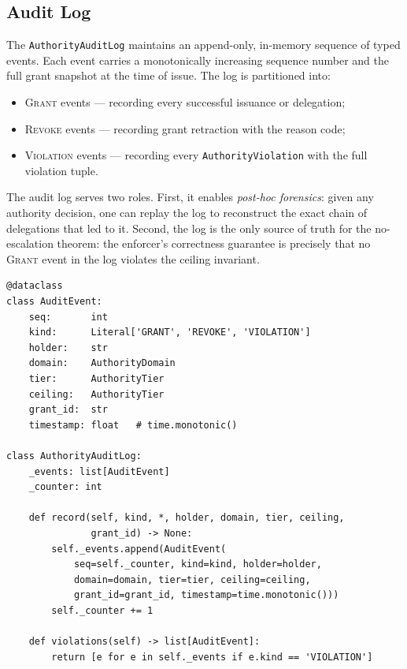\documentclass[11pt]{article}
\begin{document}
\subsection{Audit Log}

The \texttt{AuthorityAuditLog} maintains an append-only, in-memory
sequence of typed events.  Each event carries a monotonically
increasing sequence number and the full grant snapshot at the time of
issue.  The log is partitioned into:
\begin{itemize}[leftmargin=1.5em,itemsep=2pt]
  \item \textsc{Grant} events — recording every successful issuance
        or delegation;
  \item \textsc{Revoke} events — recording grant retraction with the
        reason code;
  \item \textsc{Violation} events — recording every \texttt{AuthorityViolation}
        with the full violation tuple.
\end{itemize}

The audit log serves two roles.  First, it enables \emph{post-hoc
forensics}: given any authority decision, one can replay the log to
reconstruct the exact chain of delegations that led to it.
Second, the log is the only source of truth for the no-escalation
theorem: the enforcer's correctness guarantee is precisely that no
\textsc{Grant} event in the log violates the ceiling invariant.

\begin{lstlisting}[style=jugeo-python, caption={Audit log: core event recording}]
@dataclass
class AuditEvent:
    seq:       int
    kind:      Literal['GRANT', 'REVOKE', 'VIOLATION']
    holder:    str
    domain:    AuthorityDomain
    tier:      AuthorityTier
    ceiling:   AuthorityTier
    grant_id:  str
    timestamp: float   # time.monotonic()

class AuthorityAuditLog:
    _events: list[AuditEvent]
    _counter: int

    def record(self, kind, *, holder, domain, tier, ceiling,
               grant_id) -> None:
        self._events.append(AuditEvent(
            seq=self._counter, kind=kind, holder=holder,
            domain=domain, tier=tier, ceiling=ceiling,
            grant_id=grant_id, timestamp=time.monotonic()))
        self._counter += 1

    def violations(self) -> list[AuditEvent]:
        return [e for e in self._events if e.kind == 'VIOLATION']
\end{lstlisting}
\end{document}
